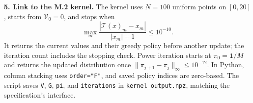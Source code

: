 \documentclass[11pt]{article}
\newcommand{\V}{\mathcal V}
\begin{document}
\textbf{5. Link to the M.2 kernel.}
The kernel uses $N=100$ uniform points on $[0,20]$, starts from $\V_0=0$, and stops when
\[
\max_m\frac{|\mathcal T(x)_m-x_m|}{|x_m|+1}\leq10^{-10}.
\]
It returns the current values and their greedy policy before another update; the iteration
count includes the stopping check. Power iteration starts at $\pi_0=\mathbf1/M$ and returns
the updated distribution once $\|\pi_{j+1}-\pi_j\|_\infty\leq10^{-12}$.
In Python, column stacking uses \texttt{order="F"}, and saved policy indices are zero-based.
The script saves \texttt{V}, \texttt{G}, \texttt{pi}, and \texttt{iterations} in
\texttt{kernel\_output.npz}, matching the specification's interface.
\end{document}

